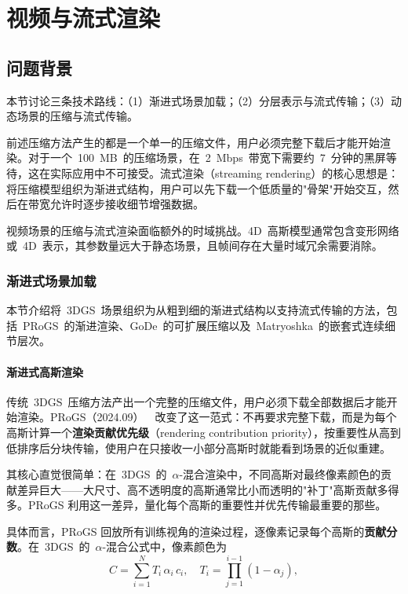 

\section{视频与流式渲染}
\label{sec:11_4}

\subsection{问题背景}

本节讨论三条技术路线：（1）渐进式场景加载；（2）分层表示与流式传输；（3）动态场景的压缩与流式传输。

前述压缩方法产生的都是一个单一的压缩文件，用户必须完整下载后才能开始渲染。对于一个~100~MB~的压缩场景，在~2~Mbps~带宽下需要约~7~分钟的黑屏等待，这在实际应用中不可接受。流式渲染（streaming rendering）的核心思想是：将压缩模型组织为渐进式结构，用户可以先下载一个低质量的"骨架"开始交互，然后在带宽允许时逐步接收细节增强数据。

视频场景的压缩与流式渲染面临额外的时域挑战。4D~高斯模型通常包含变形网络或~4D~表示，其参数量远大于静态场景，且帧间存在大量时域冗余需要消除。

\subsubsection{渐进式场景加载}

本节介绍将~3DGS~场景组织为从粗到细的渐进式结构以支持流式传输的方法，包括~PRoGS~的渐进渲染、GoDe~的可扩展压缩以及~Matryoshka~的嵌套式连续细节层次。

\paragraph{渐进式高斯渲染}

传统~3DGS~压缩方法产出一个完整的压缩文件，用户必须下载全部数据后才能开始渲染。PRoGS（2024.09）~\cite{2409_01761}~改变了这一范式：不再要求完整下载，而是为每个高斯计算一个\textbf{渲染贡献优先级}（rendering contribution priority），按重要性从高到低排序后分块传输，使用户在只接收一小部分高斯时就能看到场景的近似重建。

其核心直觉很简单：在~3DGS~的~$\alpha$-混合渲染中，不同高斯对最终像素颜色的贡献差异巨大——大尺寸、高不透明度的高斯通常比小而透明的"补丁"高斯贡献多得多。PRoGS 利用这一差异，量化每个高斯的重要性并优先传输最重要的那些。

具体而言，PRoGS 回放所有训练视角的渲染过程，逐像素记录每个高斯的\textbf{贡献分数}。在~3DGS~的~$\alpha$-混合公式中，像素颜色为
\begin{equation}
C = \sum_{i=1}^{N} T_i \, \alpha_i \, c_i, \quad T_i = \prod_{j=1}^{i-1}(1-\alpha_j),
\end{equation}

